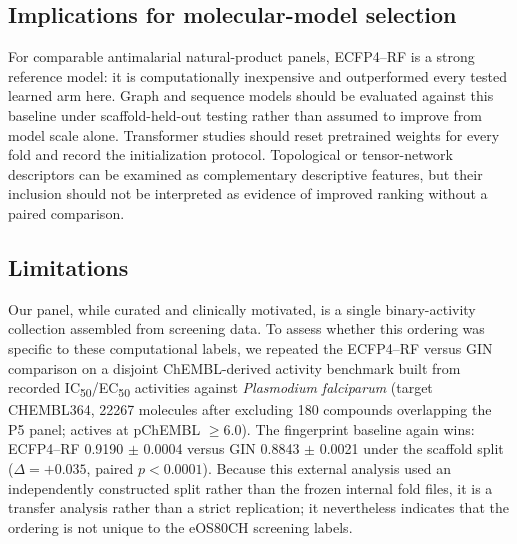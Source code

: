 \documentclass[11pt,a4paper]{article}
\begin{document}
\subsection{Implications for molecular-model selection}

For comparable antimalarial natural-product panels, ECFP4--RF is a strong reference model: it is computationally inexpensive and outperformed every tested learned arm here. Graph and sequence models should be evaluated against this baseline under scaffold-held-out testing rather than assumed to improve from model scale alone. Transformer studies should reset pretrained weights for every fold and record the initialization protocol. Topological or tensor-network descriptors can be examined as complementary descriptive features, but their inclusion should not be interpreted as evidence of improved ranking without a paired comparison.

\subsection{Limitations}

Our panel, while curated and clinically motivated, is a single binary-activity collection assembled from screening data. To assess whether this ordering was specific to these computational labels, we repeated the ECFP4--RF versus GIN comparison on a disjoint ChEMBL-derived activity benchmark built from recorded IC\textsubscript{50}/EC\textsubscript{50} activities against \emph{Plasmodium falciparum} (target CHEMBL364, \num{22267} molecules after excluding \num{180} compounds overlapping the P5 panel; actives at pChEMBL $\geq \num{6.0}$). The fingerprint baseline again wins: ECFP4--RF \num{0.9190} $\pm$ \num{0.0004} versus GIN \num{0.8843} $\pm$ \num{0.0021} under the scaffold split ($\Delta = +\num{0.035}$, paired $p < \num{0.0001}$). Because this external analysis used an independently constructed split rather than the frozen internal fold files, it is a transfer analysis rather than a strict replication; it nevertheless indicates that the ordering is not unique to the eOS80CH screening labels.
\end{document}
